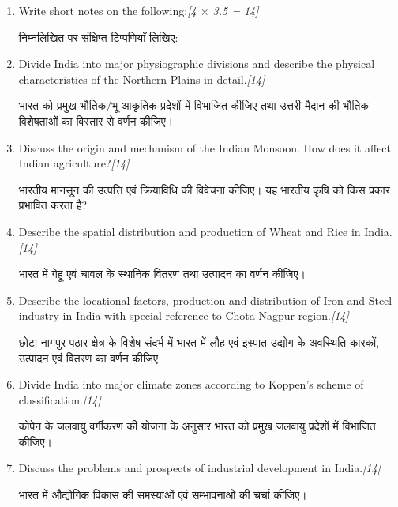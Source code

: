 \documentclass[11pt,a4paper]{article}
\newcommand{\pts}[1]{\hfill \textit{[#1]}}
\begin{document}
\begin{enumerate}[label=\textbf{\arabic*.},leftmargin=*,itemsep=14pt]

  \item Write short notes on the following:\pts{4 $\times$ 3.5 = 14}
  
  निम्नलिखित पर संक्षिप्त टिप्पणियाँ लिखिए:

  \item Divide India into major physiographic divisions and describe the physical characteristics of the Northern Plains in detail.\pts{14}
  
  भारत को प्रमुख भौतिक/भू-आकृतिक प्रदेशों में विभाजित कीजिए तथा उत्तरी मैदान की भौतिक विशेषताओं का विस्तार से वर्णन कीजिए।

  \item Discuss the origin and mechanism of the Indian Monsoon. How does it affect Indian agriculture?\pts{14}
  
  भारतीय मानसून की उत्पत्ति एवं क्रियाविधि की विवेचना कीजिए। यह भारतीय कृषि को किस प्रकार प्रभावित करता है?

  \item Describe the spatial distribution and production of Wheat and Rice in India.\pts{14}
  
  भारत में गेहूं एवं चावल के स्थानिक वितरण तथा उत्पादन का वर्णन कीजिए।

  \item Describe the locational factors, production and distribution of Iron and Steel industry in India with special reference to Chota Nagpur region.\pts{14}
  
  छोटा नागपुर पठार क्षेत्र के विशेष संदर्भ में भारत में लौह एवं इस्पात उद्योग के अवस्थिति कारकों, उत्पादन एवं वितरण का वर्णन कीजिए।

  \item Divide India into major climate zones according to Koppen's scheme of classification.\pts{14}
  
  कोपेन के जलवायु वर्गीकरण की योजना के अनुसार भारत को प्रमुख जलवायु प्रदेशों में विभाजित कीजिए।

  \item Discuss the problems and prospects of industrial development in India.\pts{14}
  
  भारत में औद्योगिक विकास की समस्याओं एवं सम्भावनाओं की चर्चा कीजिए।

\end{enumerate}
\end{document}
